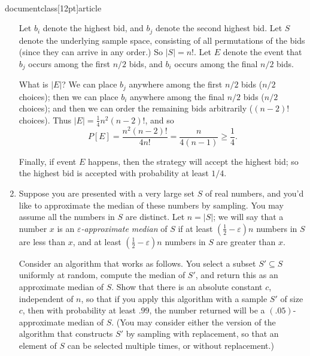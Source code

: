 \\documentclass[12pt]{article}
\def\ve{{\varepsilon}}
\begin{document}
\begin{enumerate}
{Let $b_i$ denote the highest bid, and $b_j$ denote
the second highest bid.
Let $S$ denote the underlying sample space,
consisting of all permutations of the bids
(since they can arrive in any order.)
So $|S| = n!$.
Let $E$ denote the event that $b_j$ occurs among
the first $n/2$ bids, and $b_i$ occurs among
the final $n/2$ bids.

What is $|E|$?
We can place $b_j$ anywhere among the first $n/2$ bids
($n/2$ choices);
then we can place $b_i$ anywhere among the final $n/2$ bids
($n/2$ choices);
and then we can order the remaining bids arbitrarily
($(n-2)!$ choices).
Thus $|E| = \frac14 n^2 (n-2)!$, and so
$$P[E] = \frac{n^2 (n-2)!}{4 n!} = \frac{n}{4(n-1)} \geq \frac14.$$

Finally, if event $E$ happens, then the strategy will
accept the highest bid; so the highest bid is accepted
with probability at least $1/4$.

}



\item 

Suppose you are presented with a very large set $S$ of real numbers,
and you'd like to approximate the median of these numbers by sampling.
You may assume all the numbers in $S$ are distinct.
Let $n = |S|$; we will say that a number $x$ is an
{\em $\ve$-approximate median} of $S$ if at least
$(\frac12 - \ve) n$ numbers in $S$ are less than $x$,
and at least $(\frac12 - \ve) n$ numbers in $S$ are
greater than $x$.

Consider an algorithm that works as follows.
You select a subset $S' \subseteq S$ uniformly at random,
compute the median of $S'$, and return this as an
approximate median of $S$.
Show that there is an absolute constant $c$, independent of $n$,
so that if you apply this algorithm with a sample $S'$ of size $c$,
then with probability at least $.99$,
the number returned will be a $(.05)$-approximate median of $S$.
(You may consider either the version of the algorithm
that constructs $S'$ by sampling with replacement, so that
an element of $S$ can be selected multiple times,
or without replacement.)



\end{enumerate}
\end{document}
